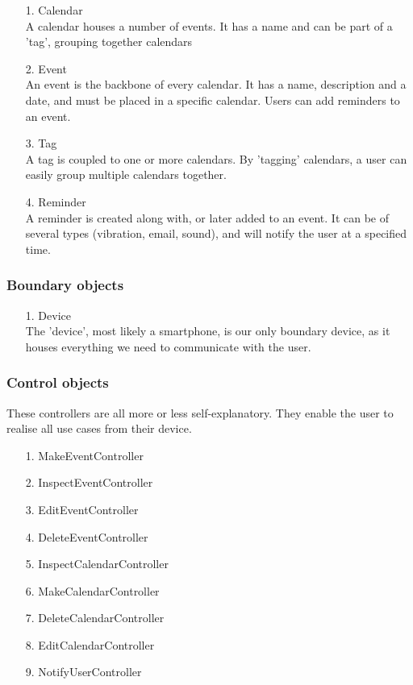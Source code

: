 \begin{enumerate}
	\item[1.] Calendar \hfill \\
	A calendar houses a number of events. It has a name and can be part of a 'tag', grouping together calendars
	\item[2.] Event \hfill \\
	An event is the backbone of every calendar. It has a name, description and a date, and must be placed in a specific calendar. Users can add reminders to an event.
	\item[3.] Tag \hfill \\
	A tag is coupled to one or more calendars. By 'tagging' calendars, a user can easily group multiple calendars together.
	\item[4.] Reminder \hfill \\
	A reminder is created along with, or later added to an event. It can be of several types (vibration, email, sound), and will notify the user at a specified time.
\end{enumerate}

\subsubsection{Boundary objects}

\begin{enumerate}
	\item[1.] Device \hfill \\
	The 'device', most likely a smartphone, is our only boundary device, as it houses everything we need to communicate with the user.
\end{enumerate}

\subsubsection{Control objects}

These controllers are all more or less self-explanatory. They enable the user to realise all use cases from their device.

\begin{enumerate}
	\item[1.] MakeEventController
	\item[2.] InspectEventController
	\item[3.] EditEventController 
	\item[4.] DeleteEventController
	\item[5.] InspectCalendarController
	\item[6.] MakeCalendarController
	\item[7.] DeleteCalendarController
	\item[8.] EditCalendarController 
	\item[9.] NotifyUserController 
\end{enumerate}

